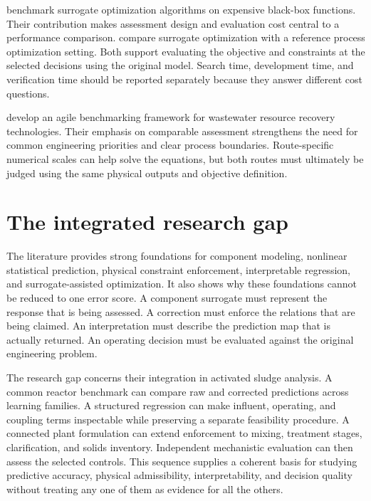 \citet{Bliek2023} benchmark surrogate optimization algorithms on expensive black-box functions. Their contribution makes assessment design and evaluation cost central to a performance comparison. \citet{Pedrozo2025} compare surrogate optimization with a reference process optimization setting. Both support evaluating the objective and constraints at the selected decisions using the original model. Search time, development time, and verification time should be reported separately because they answer different cost questions.

\citet{Zhang2026} develop an agile benchmarking framework for wastewater resource recovery technologies. Their emphasis on comparable assessment strengthens the need for common engineering priorities and clear process boundaries. Route-specific numerical scales can help solve the equations, but both routes must ultimately be judged using the same physical outputs and objective definition.

\section{The integrated research gap}

The literature provides strong foundations for component modeling, nonlinear statistical prediction, physical constraint enforcement, interpretable regression, and surrogate-assisted optimization. It also shows why these foundations cannot be reduced to one error score. A component surrogate must represent the response that is being assessed. A correction must enforce the relations that are being claimed. An interpretation must describe the prediction map that is actually returned. An operating decision must be evaluated against the original engineering problem.

The research gap concerns their integration in activated sludge analysis. A common reactor benchmark can compare raw and corrected predictions across learning families. A structured regression can make influent, operating, and coupling terms inspectable while preserving a separate feasibility procedure. A connected plant formulation can extend enforcement to mixing, treatment stages, clarification, and solids inventory. Independent mechanistic evaluation can then assess the selected controls. This sequence supplies a coherent basis for studying predictive accuracy, physical admissibility, interpretability, and decision quality without treating any one of them as evidence for all the others.
